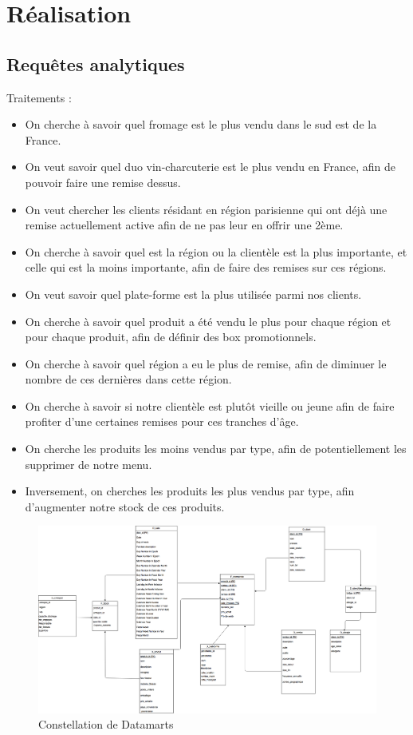 \section{Réalisation}

\subsection{Requêtes analytiques}

Traitements : 
\begin{itemize}
    \item On cherche à savoir quel fromage est le plus vendu dans le sud est de la France.
    \item On veut savoir quel duo vin-charcuterie est le plus vendu en France, afin de pouvoir faire une remise dessus.
    \item On veut chercher les clients résidant en région parisienne qui ont déjà une remise actuellement active afin de ne pas leur en offrir une 2ème.
    \item On cherche à savoir quel est la région ou la clientèle est la plus importante, et celle qui est la moins importante, afin de faire des remises sur ces régions.
    \item On veut savoir quel plate-forme est la plus utilisée parmi nos clients.
    \item On cherche à savoir quel produit a été vendu le plus pour chaque région et pour chaque produit, afin de définir des box promotionnels.
    \item On cherche à savoir quel région a eu le plus de remise, afin de diminuer le nombre de ces dernières dans cette région.
    \item On cherche à savoir si notre clientèle est plutôt vieille ou jeune afin de faire profiter d'une certaines remises pour ces tranches d'âge.
    \item On cherche les produits les moins vendus par type, afin de potentiellement les supprimer de notre menu.
    \item Inversement, on cherches les produits les plus vendus par type, afin d'augmenter notre stock de ces produits.
\end{itemize}

    \begin{figure}[h]
        \centerline{\includegraphics[scale=0.3]{Constelation.png}}
        \caption{Constellation de Datamarts}
        \label{fig:UML}
    \end{figure}
    
